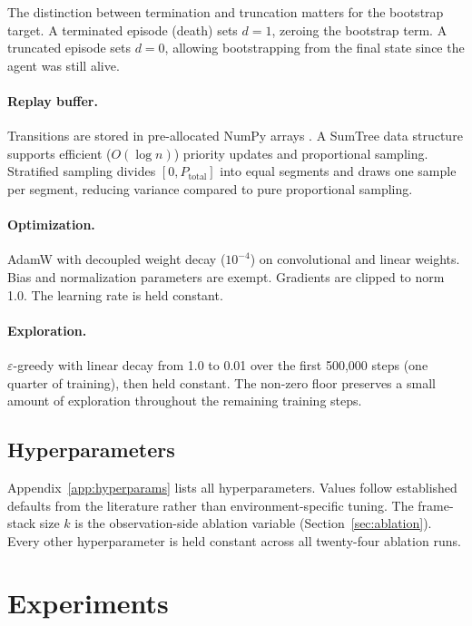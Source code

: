 \documentclass[12pt,a4paper,titlepage]{article}
\begin{document}
The distinction between termination and truncation matters for the bootstrap target. A terminated episode (death) sets $d = 1$, zeroing the bootstrap term. A truncated episode sets $d = 0$, allowing bootstrapping from the final state since the agent was still alive.

\paragraph{Replay buffer.} Transitions are stored in pre-allocated NumPy arrays \citep{Harris2020}. A SumTree data structure \citep{Schaul2016} supports efficient ($O(\log n)$) priority updates and proportional sampling. Stratified sampling divides $[0, P_\text{total}]$ into equal segments and draws one sample per segment, reducing variance compared to pure proportional sampling.

\paragraph{Optimization.} AdamW with decoupled weight decay ($10^{-4}$) on convolutional and linear weights. Bias and normalization parameters are exempt. Gradients are clipped to norm 1.0. The learning rate is held constant.

\paragraph{Exploration.} $\varepsilon$-greedy with linear decay from 1.0 to 0.01 over the first 500{,}000 steps (one quarter of training), then held constant. The non-zero floor preserves a small amount of exploration throughout the remaining training steps.

\subsection{Hyperparameters}
\label{sec:hyperparameters}

Appendix~\ref{app:hyperparams} lists all hyperparameters. Values follow established defaults from the literature rather than environment-specific tuning. The frame-stack size $k$ is the observation-side ablation variable (Section~\ref{sec:ablation}). Every other hyperparameter is held constant across all twenty-four ablation runs.

\section{Experiments}
\label{sec:experiments}
\end{document}
